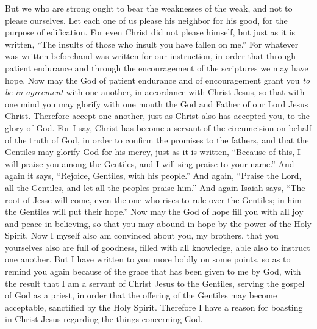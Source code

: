 \begin{biblechapter} %
 But we who are strong ought to bear the weaknesses of the weak, and not to please ourselves.
\verse Let each one of us please his neighbor for his good, for the purpose of edification.
\verse For even Christ did not please himself, but just as it is written, “The insults of those who insult you have fallen on me.”
\verse For whatever was written beforehand was written for our instruction, in order that through patient endurance and through the encouragement of the scriptures we may have hope.
\verse Now may the God of patient endurance and of encouragement grant you \textit{to be in agreement} with one another, in accordance with Christ Jesus,
\verse so that with one mind you may glorify with one mouth the God and Father of our Lord Jesus Christ.
\verse Therefore accept one another, just as Christ also has accepted you, to the glory of God.
\verse For I say, Christ has become a servant of the circumcision on behalf of the truth of God, in order to confirm the promises to the fathers,
\verse and that the Gentiles may glorify God for his mercy, just as it is written, “Because of this, I will praise you among the Gentiles, 
and I will sing praise to your name.”
\verse And again it says, “Rejoice, Gentiles, with his people.”
\verse And again, “Praise the Lord, all the Gentiles, 
and let all the peoples praise him.”
\verse And again Isaiah says, “The root of Jesse will come, 
even the one who rises to rule over the Gentiles; 
in him the Gentiles will put their hope.”
\verse Now may the God of hope fill you with all joy and peace in believing, so that you may abound in hope by the power of the Holy Spirit.
 Now I myself also am convinced about you, my brothers, that you yourselves also are full of goodness, filled with all knowledge, able also to instruct one another.
\verse But I have written to you more boldly on some points, so as to remind you again because of the grace that has been given to me by God,
\verse with the result that I am a servant of Christ Jesus to the Gentiles, serving the gospel of God as a priest, in order that the offering of the Gentiles may become acceptable, sanctified by the Holy Spirit.
\verse Therefore I have a reason for boasting in Christ Jesus regarding the things concerning God.

\end{biblechapter}
